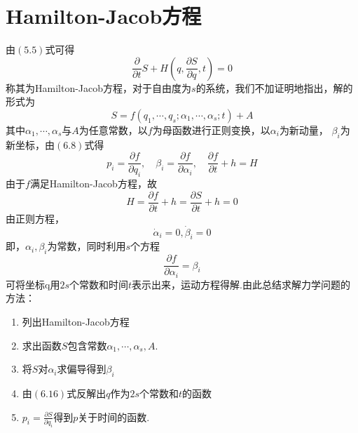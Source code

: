 \section{Hamilton-Jacob方程}
由$(5.5)$式可得
\begin{equation}
    \frac{\partial}{\partial t}S+H\left(q,\frac{\partial S}{\partial q},t\right)=0
\end{equation}
称其为Hamilton-Jacob方程，对于自由度为$s$的系统，我们不加证明地指出，解的形式为
\begin{equation}
    S=f(q_1,\cdots,q_s;\alpha_1,\cdots,\alpha_s;t)+A
\end{equation}
其中$\alpha_1,\cdots,\alpha_s$与$A$为任意常数，以$f$为母函数进行正则变换，以$\alpha_i$为新动量，
$\beta_i$为新坐标，由$(6.8)$式得
\begin{equation}
    p_i=\frac{\partial f}{\partial q_i},\quad\beta_i=\frac{\partial f}{\partial \alpha_i},\quad\frac{\partial f}{\partial t}+h=H
\end{equation}
由于$f$满足Hamilton-Jacob方程，故
\begin{equation}
    H=\frac{\partial f}{\partial t}+h=\frac{\partial S}{\partial t}+h=0
\end{equation}
由正则方程，
\begin{equation}
    \dot{\alpha}_i=0,\dot{\beta}_i=0
\end{equation}
即，$\alpha_i,\beta_i$为常数，同时利用$s$个方程
\begin{equation}
    \frac{\partial f}{\partial\alpha_i}=\beta_i
\end{equation}
可将坐标q用$2s$个常数和时间$t$表示出来，运动方程得解.由此总结求解力学问题的方法：
\begin{enumerate}[(1)]
    \item 列出Hamilton-Jacob方程
    \item 求出函数$S$包含常数$\alpha_1,\cdots,\alpha_s,A$.
    \item 将$S$对$\alpha_i$求偏导得到$\beta_i$
    \item 由$(6.16)$式反解出$q$作为$2s$个常数和$t$的函数
    \item $\displaystyle{p_i=\frac{\partial S}{\partial q_i}}$得到$p$关于时间的函数.
\end{enumerate}
